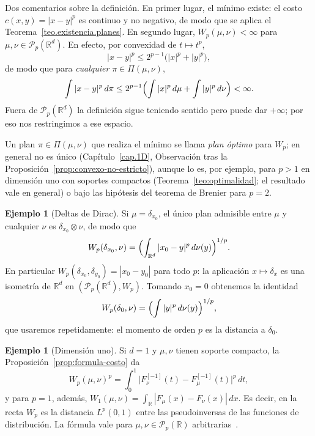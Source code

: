 \documentclass[12pt, a4paper]{amsbook}
\newcommand{\R}{{\mathbb R}}
\theoremstyle{remark}
\theoremstyle{definition}
\newtheorem{ejem}[teo]{Ejemplo}
\numberwithin{section}{chapter}
\numberwithin{subsection}{section}
\numberwithin{equation}{section}
\numberwithin{figure}{chapter}
\begin{document}
Dos comentarios sobre la definición. En primer lugar, el mínimo existe: el
costo $c(x,y)=|x-y|^p$ es continuo y no negativo, de modo que se aplica el
Teorema~\ref{teo.existencia.planes}. En segundo lugar, $W_p(\mu,\nu)<\infty$
para $\mu,\nu\in\mathcal P_p(\R^d)$. En efecto, por convexidad de $t\mapsto t^p$,
\begin{equation}\label{eq:Wp.cota.elemental}
|x-y|^p\le2^{p-1}\bigl(|x|^p+|y|^p\bigr),
\end{equation}
de modo que para \emph{cualquier} $\pi\in\Pi(\mu,\nu)$,
\[
\int|x-y|^p\,d\pi
\le2^{p-1}\Bigl(\int|x|^p\,d\mu+\int|y|^p\,d\nu\Bigr)<\infty.
\]
Fuera de $\mathcal P_p(\R^d)$ la definición sigue teniendo sentido pero puede
dar $+\infty$; por eso nos restringimos a ese espacio.

Un plan $\pi\in\Pi(\mu,\nu)$ que realiza el mínimo se llama \emph{plan
óptimo} para $W_p$; en general no es único (Capítulo~\ref{cap.1D},
Observación tras la Proposición~\ref{prop:convexo-no-estricto}), aunque lo
es, por ejemplo, para $p>1$ en dimensión uno con soportes compactos
(Teorema~\ref{teo:optimalidad}; el resultado vale en general) o bajo las
hipótesis del teorema de Brenier para $p=2$.

\begin{ejem}[Deltas de Dirac]\label{ej.Wp.diracs}
Si $\mu=\delta_{x_0}$, el único plan admisible entre $\mu$ y cualquier $\nu$
es $\delta_{x_0}\otimes\nu$, de modo que
\[
W_p(\delta_{x_0},\nu)=\Bigl(\int_{\R^d}|x_0-y|^p\,d\nu(y)\Bigr)^{1/p}.
\]
En particular $W_p(\delta_{x_0},\delta_{y_0})=|x_0-y_0|$ para todo $p$: la
aplicación $x\mapsto\delta_x$ es una isometría de $\R^d$ en
$(\mathcal P_p(\R^d),W_p)$. Tomando $x_0=0$ obtenemos la identidad
\begin{equation}\label{eq:Wp.momento}
W_p(\delta_0,\nu)=\Bigl(\int|y|^p\,d\nu(y)\Bigr)^{1/p},
\end{equation}
que usaremos repetidamente: el momento de orden $p$ es la distancia a
$\delta_0$.
\end{ejem}

\begin{ejem}[Dimensión uno]\label{ej.Wp.1D}
Si $d=1$ y $\mu,\nu$ tienen soporte compacto, la
Proposición~\ref{prop:formula-costo} da
\[
W_p(\mu,\nu)^p=\int_0^1\bigl|F_\nu^{[-1]}(t)-F_\mu^{[-1]}(t)\bigr|^p\,dt,
\]
y para $p=1$, además, $W_1(\mu,\nu)=\int_\R|F_\mu(x)-F_\nu(x)|\,dx$. Es decir,
en la recta $W_p$ es la distancia $L^p(0,1)$ entre las pseudoinversas de las
funciones de distribución. La fórmula vale para $\mu,\nu\in\mathcal P_p(\R)$
arbitrarias~\cite[Proposition~2.17]{Santambrogio}.
\end{ejem}
\end{document}
